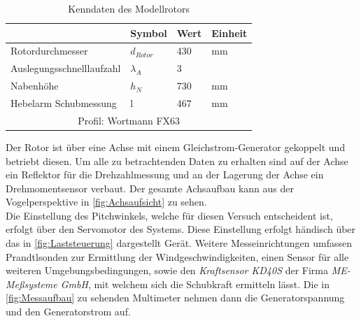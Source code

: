\begin{table}[H]
    \centering
    \begin{tabular}{llll}
    \hline
                              & Symbol      & Wert & Einheit \\ \hline
    Rotordurchmesser          & $d_{Rotor}$ & 430  & mm      \\
    Auslegungsschnelllaufzahl & $\lambda_A$ & 3    &         \\
    Nabenhöhe                 & $h_N$       & 730  & mm      \\
    Hebelarm Schubmessung     & l           & 467  & mm      \\ \hline
    \multicolumn{4}{c}{Profil: Wortmann FX63}                \\ \hline
    \end{tabular}
    \caption{Kenndaten des Modellrotors}
    \label{tab:Rotorkenndaten}
    \end{table}
Der Rotor ist über eine Achse mit einem Gleichstrom-Generator gekoppelt und betriebt diesen.
Um alle zu betrachtenden Daten zu erhalten sind auf der Achse ein Reflektor für die Drehzahlmessung und an der Lagerung der Achse ein Drehmomentsensor verbaut.
Der gesamte Achsaufbau kann aus der Vogelperspektive in \autoref{fig:Achsaufsicht} zu sehen.\\
Die Einstellung des Pitchwinkels, welche für diesen Versuch entscheident ist, erfolgt über den Servomotor des Systems. Diese Einstellung erfolgt händisch über das in \autoref{fig:Laststeuerung} dargestellt Gerät.
Weitere Messeinrichtungen umfassen Prandtlsonden zur Ermittlung der Windgeschwindigkeiten, einen Sensor für alle weiteren Umgebungsbedingungen, sowie den \textit{Kraftsensor KD40S} der Firma \textit{ME-Meßsysteme GmbH}, mit welchem sich die Schubkraft ermitteln lässt.
Die in \autoref{fig:Messaufbau} zu sehenden Multimeter nehmen dann die Generatorspannung und den Generatorstrom auf.
